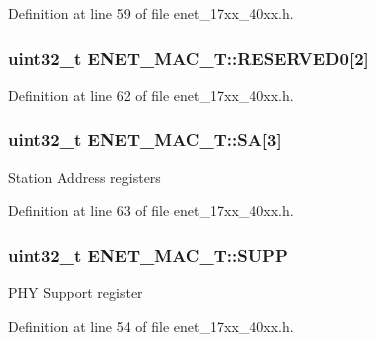 Definition at line 59 of file enet\+\_\+17xx\+\_\+40xx.\+h.

\subsubsection[{\texorpdfstring{R\+E\+S\+E\+R\+V\+E\+D0}{RESERVED0}}]{\setlength{\rightskip}{0pt plus 5cm}uint32\+\_\+t E\+N\+E\+T\+\_\+\+M\+A\+C\+\_\+\+T\+::\+R\+E\+S\+E\+R\+V\+E\+D0\mbox{[}2\mbox{]}}\hypertarget{structENET__MAC__T_a6e6d5f331b8f5ab0012d265d0a1ff6b1}{}\label{structENET__MAC__T_a6e6d5f331b8f5ab0012d265d0a1ff6b1}


Definition at line 62 of file enet\+\_\+17xx\+\_\+40xx.\+h.

\subsubsection[{\texorpdfstring{SA}{SA}}]{ uint32\+\_\+t E\+N\+E\+T\+\_\+\+M\+A\+C\+\_\+\+T\+::\+SA\mbox{[}3\mbox{]}}\hypertarget{structENET__MAC__T_a25214ef3698b23b87fea95b7158a11ad}{}\label{structENET__MAC__T_a25214ef3698b23b87fea95b7158a11ad}
Station Address registers 

Definition at line 63 of file enet\+\_\+17xx\+\_\+40xx.\+h.

\subsubsection[{\texorpdfstring{S\+U\+PP}{SUPP}}]{ uint32\+\_\+t E\+N\+E\+T\+\_\+\+M\+A\+C\+\_\+\+T\+::\+S\+U\+PP}\hypertarget{structENET__MAC__T_ad7232a883f980074136d81f8a15d8bb5}{}\label{structENET__MAC__T_ad7232a883f980074136d81f8a15d8bb5}
P\+HY Support register 

Definition at line 54 of file enet\+\_\+17xx\+\_\+40xx.\+h.

